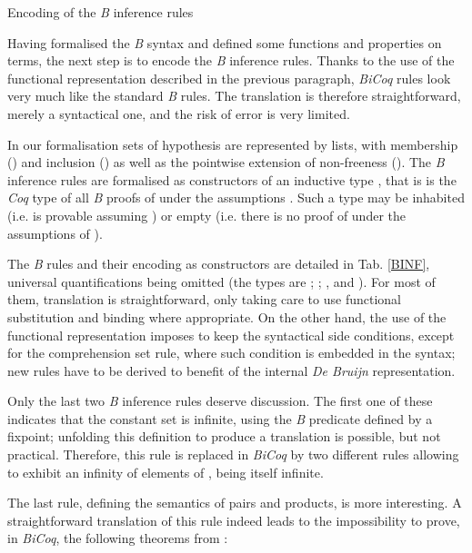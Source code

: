 \documentclass{llncs}
\begin{document}
\begin{table}
\caption{Encoding of the \emph{B} inference rules}
\label{BINF}

\end{table}

Having formalised the \emph{B} syntax and defined some functions and properties on terms, the 
next step is to encode the \emph{B} inference rules. Thanks to the use of the functional 
representation described in the previous paragraph, \emph{BiCoq} rules look very much like the 
standard \emph{B} rules. The translation is therefore straightforward, merely a syntactical 
one, and the risk of error is very limited.

In our formalisation sets of hypothesis are represented by lists, with membership () and 
inclusion () as well as the pointwise extension of non-freeness ().
The \emph{B} inference rules are formalised as constructors of an inductive type
, that is  is the \emph{Coq} type of all 
\emph{B} proofs of  under the assumptions . Such a type may be inhabited (i.e.  is 
provable assuming ) or empty (i.e. there is no proof of  under the assumptions of ).

The \emph{B} rules and their encoding as constructors are detailed in Tab.
\ref{BINF}, universal quantifications being omitted (the types are ; 
; ,  and 
). For most of them, translation is straightforward, only taking care to 
use functional substitution and binding where appropriate. On the other hand, the use of the 
functional representation imposes to keep the syntactical side conditions, except for the 
comprehension set rule, where such condition is embedded in the syntax; new rules have to be 
derived to benefit of the internal \emph{De Bruijn} representation.

Only the last two \emph{B} inference rules deserve discussion. The first one of these
indicates that the constant set  is infinite, using the  
\emph{B} predicate defined by a fixpoint; unfolding this definition to produce a translation is
possible, but not practical. Therefore, this rule is replaced in \emph{BiCoq} by two different 
rules allowing to exhibit an infinity of elements of ,  being itself 
infinite.

The last rule, defining the semantics of pairs and products, is more interesting. A 
straightforward translation of this rule indeed leads to the impossibility to prove, in 
\emph{BiCoq}, the following theorems from \cite{abr:1}:
\end{document}
